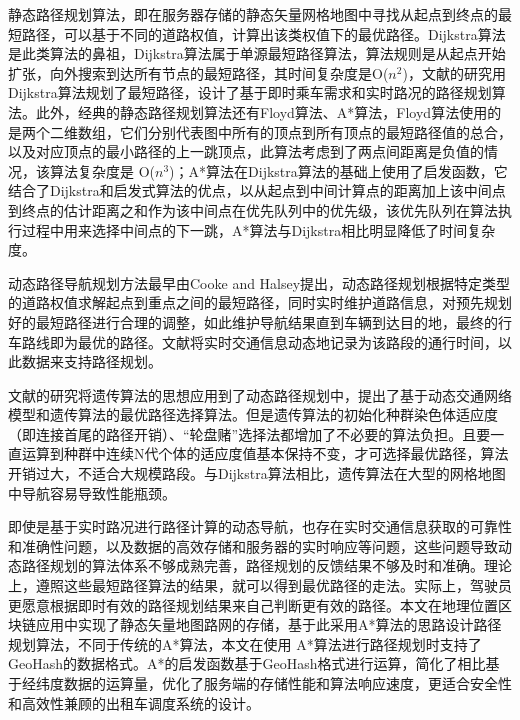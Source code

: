 静态路径规划算法，即在服务器存储的静态矢量网格地图中寻找从起点到终点的最短路径，可以基于不同的道路权值，计算出该类权值下的最优路径。Dijkstra算法是此类算法的鼻祖，Dijkstra算法属于单源最短路径算法，算法规则是从起点开始扩张，向外搜索到达所有节点的最短路径，其时间复杂度是O($ n^{2} $)，文献的研究用Dijkstra算法规划了最短路径，设计了基于即时乘车需求和实时路况的路径规划算法。此外，经典的静态路径规划算法还有Floyd算法、A*算法，Floyd算法使用的是两个二维数组，它们分别代表图中所有的顶点到所有顶点的最短路径值的总合，以及对应顶点的最小路径的上一跳顶点，此算法考虑到了两点间距离是负值的情况，该算法复杂度是 O($ n^{3} $)；A*算法在Dijkstra算法的基础上使用了启发函数，它结合了Dijkstra和启发式算法的优点，以从起点到中间计算点的距离加上该中间点到终点的估计距离之和作为该中间点在优先队列中的优先级，该优先队列在算法执行过程中用来选择中间点的下一跳，A*算法与Dijkstra相比明显降低了时间复杂度。

动态路径导航规划方法最早由Cooke and Halsey提出，动态路径规划根据特定类型的道路权值求解起点到重点之间的最短路径，同时实时维护道路信息，对预先规划好的最短路径进行合理的调整，如此维护导航结果直到车辆到达目的地，最终的行车路线即为最优的路径。文献将实时交通信息动态地记录为该路段的通行时间，以此数据来支持路径规划。

文献的研究将遗传算法的思想应用到了动态路径规划中，提出了基于动态交通网络模型和遗传算法的最优路径选择算法。但是遗传算法的初始化种群染色体适应度（即连接首尾的路径开销）、“轮盘赌”选择法都增加了不必要的算法负担。且要一直运算到种群中连续N代个体的适应度值基本保持不变，才可选择最优路径，算法开销过大，不适合大规模路段。与Dijkstra算法相比，遗传算法在大型的网格地图中导航容易导致性能瓶颈。

即使是基于实时路况进行路径计算的动态导航，也存在实时交通信息获取的可靠性和准确性问题，以及数据的高效存储和服务器的实时响应等问题，这些问题导致动态路径规划的算法体系不够成熟完善，路径规划的反馈结果不够及时和准确。理论上，遵照这些最短路径算法的结果，就可以得到最优路径的走法。实际上，驾驶员更愿意根据即时有效的路径规划结果来自己判断更有效的路径。本文在地理位置区块链应用中实现了静态矢量地图路网的存储，基于此采用A*算法的思路设计路径规划算法，不同于传统的A*算法，本文在使用 A*算法进行路径规划时支持了GeoHash的数据格式。A*的启发函数基于GeoHash格式进行运算，简化了相比基于经纬度数据的运算量，优化了服务端的存储性能和算法响应速度，更适合安全性和高效性兼顾的出租车调度系统的设计。

